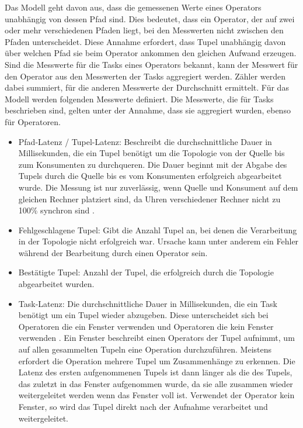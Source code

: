 Das Modell geht davon aus, dass die gemessenen Werte eines Operators unabhängig von dessen Pfad sind.
Dies bedeutet, dass ein Operator, der auf zwei oder mehr verschiedenen Pfaden liegt, bei den Messwerten nicht zwischen den Pfaden unterscheidet.
Diese Annahme erfordert, dass Tupel unabhängig davon über welchen Pfad sie beim Operator ankommen den gleichen Aufwand erzeugen.
Sind die Messwerte für die Tasks eines Operators bekannt, kann der Messwert für den Operator aus den Messwerten der Tasks aggregiert werden.
Zähler werden dabei summiert, für die anderen Messwerte der Durchschnitt ermittelt.
Für das Modell werden folgenden Messwerte definiert.
Die Messwerte, die für Tasks beschrieben sind, gelten unter der Annahme, dass sie aggregiert wurden, ebenso für Operatoren.

\begin{itemize}
\item{Pfad-Latenz / Tupel-Latenz: Beschreibt die durchschnittliche Dauer in Millisekunden, die ein Tupel benötigt um die Topologie von der Quelle bis zum Konsumenten zu durchqueren. 
Die Dauer beginnt mit der Abgabe des Tupels durch die Quelle bis es vom Konsumenten erfolgreich abgearbeitet wurde. 
Die Messung ist nur zuverlässig, wenn Quelle und Konsument auf dem gleichen Rechner platziert sind, da Uhren verschiedener Rechner nicht zu 100\% synchron sind \cite{goggel_vergleich_2018}.}
\item{Fehlgeschlagene Tupel: Gibt die Anzahl Tupel an,  bei denen die Verarbeitung in der Topologie nicht erfolgreich war.
Ursache kann unter anderem ein Fehler während der Bearbeitung durch einen Operator sein.}
\item{Bestätigte Tupel: Anzahl der Tupel, die erfolgreich durch die Topologie abgearbeitet wurden.}
\item{Task-Latenz: Die durchschnittliche Dauer in Millisekunden, die ein Task benötigt um ein Tupel wieder abzugeben. 
Diese unterscheidet sich bei Operatoren die ein Fenster verwenden und Operatoren die kein Fenster verwenden  \cite{lohrmann_elastic_2015}.
Ein Fenster beschreibt einen Operators der Tupel aufnimmt, um auf allen gesammelten Tupeln eine Operation durchzuführen.
Meistens erfordert die Operation mehrere Tupel um Zusammenhänge zu erkennen.
Die Latenz des ersten aufgenommenen Tupels ist dann länger als die des Tupels, das zuletzt in das Fenster aufgenommen wurde, da sie alle zusammen wieder weitergeleitet werden wenn das Fenster voll ist. 
Verwendet der Operator kein Fenster, so wird das Tupel direkt nach der Aufnahme verarbeitet und weitergeleitet.
}
\end{itemize}
